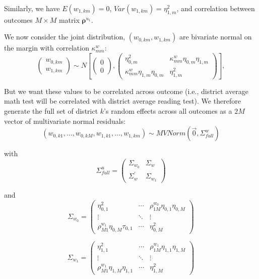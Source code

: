 \documentclass[12pt]{article}
\newcommand\mb[1]{\boldsymbol{#1}}
\begin{document}
Similarly, we have $E(w_{1,km}) = 0$, $Var(w_{1,km}) = \eta_{1,m}^2$, and correlation between outcomes $M \times M$ matrix $\mb{\rho}^{u_1}$.


We now consider the joint distribution, $(w_{0,km}, w_{1,km})$ are bivariate normal on the margin with correlation $\kappa^{w}_{mm}$:
\begin{equation}
\left(
\begin{array}{c}
w_{0,km}\\
w_{1,km}
\end{array} \right)
\sim
N\left[\left(
\begin{array}{c}
0\\
0\end{array}
\right),\left(
\begin{array}{cc}
\eta_{0,m}^2 									& \kappa^{w}_{mm} \eta_{0,m} \eta_{1,m} \\
\kappa^{w}_{mm}  \eta_{1,m} \eta_{0,m}  			& \eta_{1,m}^2
\end{array}
\right)\right], \label{eq:pairwise_corr_level3}
\end{equation}

But we want these values to be correlated across outcome (i.e., district average math test will be correlated with district average reading test).
We therefore generate the full set of district $k$'s random effects across all outcomes as a $2M$ vector of multivariate normal residuals:
\[ (w_{0,k1}, \ldots, w_{0,kM}, w_{1,k1}, \ldots, w_{1,km} ) \sim MVNorm( \vec{0}, \Sigma_{full}^{w} ) \]

with
\[ \Sigma_{full}^{u} =
\left(
\begin{array}{cc}
\Sigma_{w_0} 		& \Sigma_{w} \\
\Sigma_{w}^\prime 	& \Sigma_{w_1}
\end{array}
\right)
\]

and 
\[ \Sigma_{w_0} =
\left(
\begin{array}{ccc}
\eta_{0,1}^2 								& \cdots & \rho^{w_0}_{1M} \eta_{0,1} \eta_{0,M}  \\
\vdots 										& \ddots & \vdots \\
\rho^{w_1}_{M1} \eta_{0,M} \tau_{0,1} 		& \cdots & \eta_{0,M}^2
\end{array}
\right)
\]

\[ \Sigma_{w_1} =
\left(
\begin{array}{ccc}
\eta_{1,1}^2 							& \cdots & \rho^{w_1}_{1M} \eta_{1,1} \eta_{1,M}  \\
\vdots 									& \ddots & \vdots \\
\rho^{w_1}_{M1} \eta_{1,M} \eta_{1,1}	& \cdots & \eta_{1,M}^2
\end{array}
\right)
\]
\end{document}
